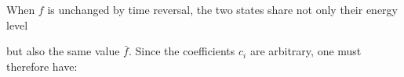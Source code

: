 When $f$ is unchanged by time reversal, the two states share not only their energy level

but also the same value $\bar f$.
Since the coefficients $c_i$ are arbitrary, one must therefore have:
